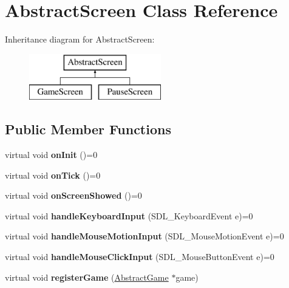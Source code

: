 \hypertarget{class_abstract_screen}{}\section{Abstract\+Screen Class Reference}
\label{class_abstract_screen}
Inheritance diagram for Abstract\+Screen\+:\begin{figure}[H]
\begin{center}
\leavevmode
\includegraphics[height=2.000000cm]{class_abstract_screen}
\end{center}
\end{figure}
\subsection*{Public Member Functions}
\begin{DoxyCompactItemize}
\item 
\mbox{\label{class_abstract_screen_a7ab389bd33f4824d3d353b5a9e1616de}} 
virtual void {\bfseries on\+Init} ()=0
\item 
\mbox{\label{class_abstract_screen_a3861213630fd23d4a3ff392191614ec2}} 
virtual void {\bfseries on\+Tick} ()=0
\item 
\mbox{\label{class_abstract_screen_a219687a34e6aed15a9eaf0d4414d1783}} 
virtual void {\bfseries on\+Screen\+Showed} ()=0
\item 
\mbox{\label{class_abstract_screen_ad618b78e55faf59bab580e920461b790}} 
virtual void {\bfseries handle\+Keyboard\+Input} (S\+D\+L\+\_\+\+Keyboard\+Event e)=0
\item 
\mbox{\label{class_abstract_screen_ab05039a94ee494811800187787636d2b}} 
virtual void {\bfseries handle\+Mouse\+Motion\+Input} (S\+D\+L\+\_\+\+Mouse\+Motion\+Event e)=0
\item 
\mbox{\label{class_abstract_screen_a9f9631ff1a9078b96bcf31e062f7379e}} 
virtual void {\bfseries handle\+Mouse\+Click\+Input} (S\+D\+L\+\_\+\+Mouse\+Button\+Event e)=0
\item 
\mbox{\label{class_abstract_screen_a64d29254d2ad4f9c8050e8f56d3c27a8}} 
virtual void {\bfseries register\+Game} (\mbox{\hyperlink{class_abstract_game}{Abstract\+Game}} $\ast$game)
\end{DoxyCompactItemize}
